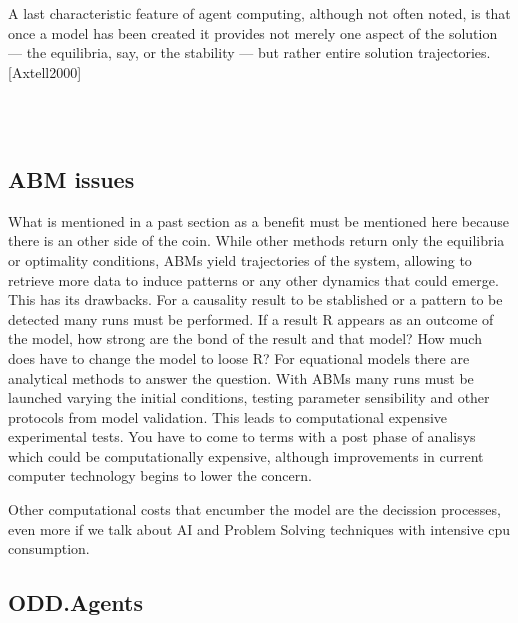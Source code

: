 \documentclass{report}
\begin{document}
\begin{enumeration}
\begin{end}
A last characteristic feature of agent computing, although not often noted, is that once a model has been created it provides not merely one aspect of the solution — the equilibria, say, or the stability — but rather entire solution trajectories.[Axtell2000]

\\
\\
\subsection{ABM issues}

What is mentioned in a past section as a benefit must be mentioned here because there is an other side of the coin.
While other methods return only the equilibria or optimality conditions, ABMs yield trajectories of the
system, allowing to retrieve more data to induce patterns or any other dynamics that could emerge. This has its
drawbacks. For a causality result to be stablished or a pattern to be detected many runs must be performed.
If a result R appears as an outcome of the model, how strong are the bond of the result and that model? How
much does have to change the model to loose R? For equational models there are analytical methods to answer
the question. With ABMs many runs must be launched varying the initial conditions, testing parameter sensibility
and other protocols from model validation. This leads to computational expensive experimental tests. 
You have to come to terms with a post phase of analisys which could be computationally expensive, although improvements
in current computer technology begins to lower the concern.
\cite{Axtell2000}

Other computational costs that encumber the model are the decission processes, even more if we talk about AI and Problem Solving techniques with intensive cpu consumption.%



\subsection{ODD.Agents} %




\end{end}
\end{enumeration}
\end{document}

